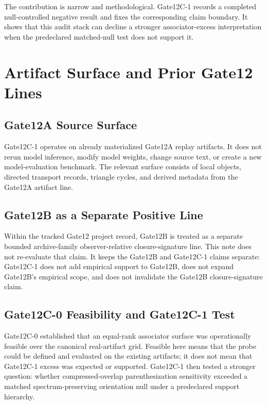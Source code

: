\documentclass[11pt]{article}
\begin{document}
The contribution is narrow and methodological. Gate12C-1 records a completed
null-controlled negative result and fixes the corresponding claim boundary. It
shows that this audit stack can decline a stronger associator-excess
interpretation when the predeclared matched-null test does not support it.

\section{Artifact Surface and Prior Gate12 Lines}
\label{sec:background}

\subsection{Gate12A Source Surface}

Gate12C-1 operates on already materialized Gate12A replay artifacts. It does
not rerun model inference, modify model weights, change source text, or create
a new model-evaluation benchmark. The relevant surface consists of local
objects, directed transport records, triangle cycles, and derived metadata from
the Gate12A artifact line.

\subsection{Gate12B as a Separate Positive Line}

Within the tracked Gate12 project record, Gate12B is treated as a separate
bounded archive-family observer-relative closure-signature line. This note does
not re-evaluate that claim. It keeps the Gate12B and Gate12C-1 claims separate:
Gate12C-1 does not add empirical support to Gate12B, does not expand Gate12B's
empirical scope, and does not invalidate the Gate12B closure-signature claim.

\subsection{Gate12C-0 Feasibility and Gate12C-1 Test}

Gate12C-0 established that an equal-rank associator surface was operationally
feasible over the canonical real-artifact grid. Feasible here means that the
probe could be defined and evaluated on the existing artifacts; it does not
mean that Gate12C-1 excess was expected or supported. Gate12C-1 then tested a
stronger question: whether compressed-overlap parenthesization sensitivity
exceeded a matched spectrum-preserving orientation null under a predeclared
support hierarchy.
\end{document}
